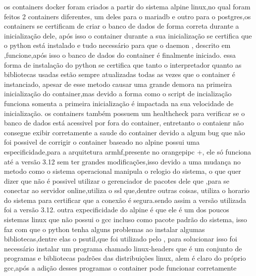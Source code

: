 \documentclass[
	12pt,				%
	openright,			%
	oneside,			%
	a4paper,			%
	english,			%
	french,				%
	spanish,			%
	brazil,				%
	]{abntex2}
\begin{document}
os containers docker foram criados a partir do sistema alpine linux,no qual foram feitos 2 containers diferentes,
um deles para o mariadb e outro para o postgres,os containers se certificam de criar o banco de dados de forma correta durante a inicialização dele,
após isso o container durante a sua inicialização se certifica que o python está instalado e tudo necessário para que o daemon ,
descrito em ,funcione,após isso o banco de dados do container é finalmente iniciado.
essa forma de instalação do python se certifica que tanto o interpretador quanto as bibliotecas usadas estão sempre atualizadas todas as vezes que o container é instanciado,
apesar de esse metodo causar uma grande demora na primeira inicialização do container,mas devido a forma como o script de incialização funciona somenta a primeira inicialização é impactada na sua velocidade de inicialização.
os containers também possuem um healthcheck para verificar se o banco de dados está acessivel por fora do container,
entretanto o contaienr não consegue exibir corretamente a saude do container devido a algum bug que não foi possivel de corrigir
o container baseado no alpine possui uma especificidade,para a arquitetura armhf,presente no orangepipc +,
ele só funciona até a versão 3.12 sem ter grandes modificações,isso devido a uma mudança no metodo como o sistema operacional manipula o relogio do sistema,
o que quer dizer que não é possivel utilizar o gerenciador de pacotes dele que ,para se conectar ao servidor online,utiliza o ssl que,dentre outras coisas,
utiliza o horario do sistema para certificar que a conexão é segura.sendo assim a versão utilizada foi a versão 3.12.
outra expecificidade do alpine é que ele é um dos poucos sistemas linux que não possui o gcc incluso como pacote padrão do sistema,
isso faz com que o python tenha alguns problemas ao instalar algumas bibliotecas,dentre elas o psutil,que foi utilizado pelo ,
para solucionar isso foi necessário instalar um programa chamado linux-headers que é um conjunto de programas e bibliotecas padrões das distribuições linux,
alem é claro do próprio gcc,após a adição desses programas o container pode funcionar corretamente
\end{document}
